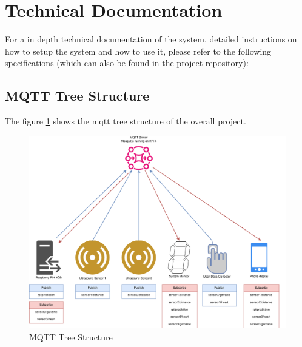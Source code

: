 \documentclass{article}
\begin{document}
\newpage
\section{Technical Documentation}
For a in depth technical documentation of the system, detailed 
instructions on how to setup the system and how to use it, please refer to the following specifications
(which can also be found in the project repository):

\subsection{MQTT Tree Structure}
The figure \ref{figura:mqtt} shows the mqtt tree structure of the overall project.
\begin{figure}[!htbp]
    \includegraphics[scale = 0.09]{../images/mqtt-diagram.png}
    \centering
    \caption{MQTT Tree Structure}
    \label{figura:mqtt}
\end{figure}



\end{document}
